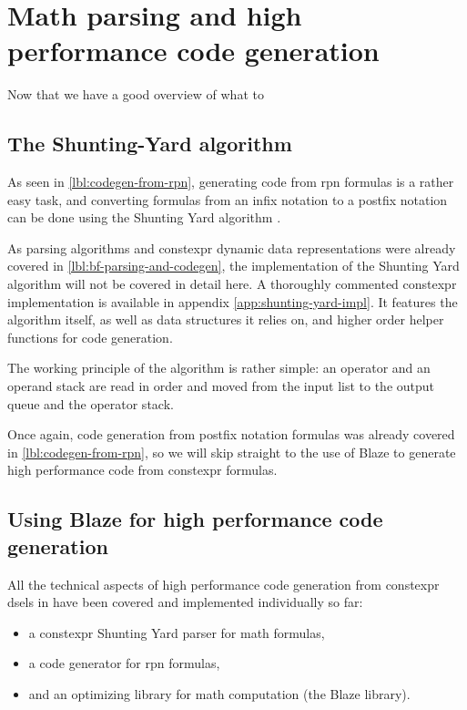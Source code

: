 \documentclass[../main]{subfiles}
\begin{document}

\section{
  Math parsing and high performance code generation
}

Now that we have a good overview of what to

\subsection{
  The Shunting-Yard algorithm
}

As seen in \ref{lbl:codegen-from-rpn}, generating code from \gls{rpn} formulas
is a rather easy task, and converting formulas from an infix notation to a
postfix notation can be done using the Shunting Yard
algorithm \cite{shunting-yard}.

As parsing algorithms and \gls{constexpr} dynamic data representations were
already covered in \ref{lbl:bf-parsing-and-codegen}, the implementation of
the Shunting Yard algorithm will not be covered in detail here.
A thoroughly commented \gls{constexpr} implementation is available in appendix
\ref{app:shunting-yard-impl}. It features the algorithm itself, as well as
data structures it relies on, and higher order helper functions
for code generation.

The working principle of the algorithm is rather simple:
an operator and an operand stack are read in order and moved
from the input list to the output queue and the operator stack.


Once again, code generation from postfix notation formulas was already covered
in \ref{lbl:codegen-from-rpn}, so we will skip straight to the use of Blaze
to generate high performance code from \gls{constexpr} formulas.

\subsection{
  Using Blaze for high performance code generation
}

All the technical aspects of high performance code generation from
\gls{constexpr} \glspl{dsel} in  have been covered and implemented
individually so far:

\begin{itemize}
\item a \gls{constexpr} Shunting Yard parser for math formulas,
\item a code generator for \gls{rpn} formulas,
\item and an optimizing library for math computation (the Blaze library).
\end{itemize}
\end{document}
